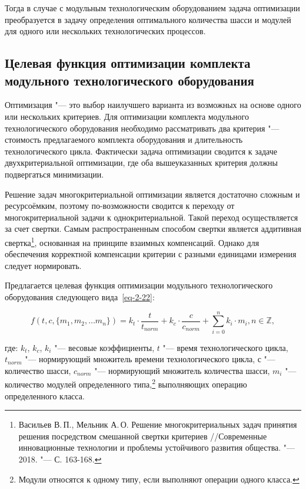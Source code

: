 Тогда в случае с модульным технологическим оборудованием задача оптимизации преобразуется в задачу определения оптимального количества шасси и модулей для одного или нескольких технологических процессов.

\subsection{Целевая функция оптимизации комплекта модульного технологического оборудования}\label{sec:target-func}

Оптимизация "--- это выбор наилучшего варианта из возможных на основе одного или нескольких критериев. Для оптимизации комплекта модульного технологического оборудования необходимо рассматривать два критерия "--- стоимость предлагаемого комплекта оборудования и длительность технологического цикла. Фактически задача оптимизации сводится к задаче двухкритериальной оптимизации, где оба вышеуказанных критерия должны подвергаться минимизации.

Решение задач многокритериальной оптимизации является достаточно сложным и ресурсоёмким, поэтому по-возможности сводится к переходу от многокритериальной задачи к однокритериальной. Такой переход осуществляется за счет свертки. Самым распространенным способом свертки является аддитивная свертка\footnote{Васильев В.\,П., Мельник А.\,О. Решение многокритериальных задач принятия решения посредством смешанной свертки критериев //Современные инновационные технологии и проблемы устойчивого развития общества. "--- 2018. "--- С. 163-168.}, основанная на принципе взаимных компенсаций. Однако для обеспечения корректной компенсации критерии с разными единицами измерения следует нормировать.
 
Предлагается целевая функция оптимизации модульного технологического оборудования следующего вида~\cref{eq-2-22}:

\begin{equation}
f(t, c, \{m_1, m_2, \ldots m_n \}) = k_t \cdot \frac{t}{t_{norm}} + k_c \cdot \frac{c}{c_{norm}} + \sum_{i=0}^{n}k_i \cdot m_i, n \in \mathbb{Z},
\label{eq-2-22}
\end{equation}

\noindent где:
\noindent $k_t$, $k_c$, $k_i$ "--- весовые коэффициенты,
\noindent $t$ "--- время технологического цикла,
\noindent $t_{norm}$ "--- нормирующий множитель времени технологического цикла,
\noindent $с$ "--- количество шасси,
\noindent $c_{norm}$ "--- нормирующий множитель количества шасси,
\noindent $m_i$ "--- количество модулей определенного типа,\footnote{Модули относятся к одному типу, если выполняют операции одного класса.} выполняющих операцию определенного класса.

